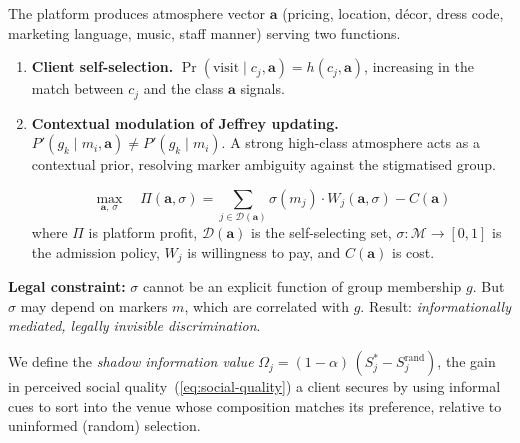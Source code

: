 \documentclass[pdflatex,sn-basic]{sn-jnl}
\newcommand{\M}{\mathcal{M}}
\theoremstyle{thmstyleone}
\numberwithin{proposition}{subsection}
\begin{document}
The platform produces atmosphere vector
$\mathbf{a}$ (pricing, location, d\'{e}cor, dress code,
marketing language, music, staff manner) serving two functions.
\begin{enumerate}

\item \textbf{Client self-selection.}
$\Pr(\text{visit} \mid c_j, \mathbf{a}) = h(c_j, \mathbf{a})$,
increasing in the match between $c_j$ and the class $\mathbf{a}$
signals.

\item \textbf{Contextual modulation of Jeffrey updating.}
$P'(g_k \mid m_i, \mathbf{a}) \neq P'(g_k \mid m_i)$. A strong
high-class atmosphere acts as a contextual prior, resolving marker
ambiguity against the stigmatised group.

\begin{equation}
  \max_{\mathbf{a},\, \sigma} \quad
  \Pi(\mathbf{a}, \sigma) = \sum_{j \in \mathcal{D}(\mathbf{a})}
  \sigma(m_j) \cdot W_j(\mathbf{a}, \sigma) - C(\mathbf{a})
  \label{eq:platform-opt}
\end{equation}
where $\Pi$ is platform profit, $\mathcal{D}(\mathbf{a})$ is the
self-selecting set,
$\sigma: \M \to [0,1]$ is the admission policy, $W_j$ is willingness
to pay, and $C(\mathbf{a})$ is cost.
\end{enumerate}

\textbf{Legal constraint:} $\sigma$ cannot be an explicit function of
group membership $g$. But $\sigma$ may depend on markers $m$, which
are correlated with $g$. Result: \emph{informationally mediated,
legally invisible discrimination}.

We define the \emph{shadow information value}
$\Omega_j = (1-\alpha)\,(S_j^{*} - S_j^{\mathrm{rand}})$, the gain in
perceived social quality~(\ref{eq:social-quality}) a client secures by
using informal cues to sort into the venue whose composition matches
its preference, relative to uninformed (random) selection.
\end{document}
